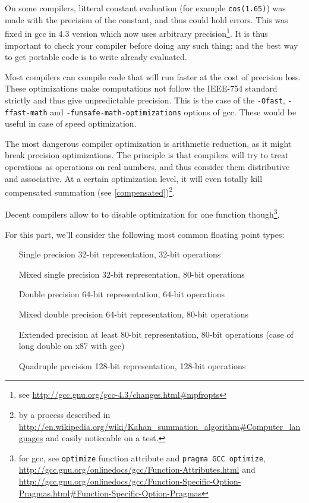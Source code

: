 
On some compilers, litteral constant evaluation (for example \texttt{cos(1.65)}) was made with the precision of the constant, and thus could hold errors. This was fixed in gcc in 4.3 version which now uses arbitrary precision\footnote{see \url{http://gcc.gnu.org/gcc-4.3/changes.html\#mpfropts}}. It is thus important to check your compiler before doing any such thing; and the best way to get portable code is to write already evaluated.


Most compilers can compile code that will run faster at the cost of precision loss. These optimizations make computations not follow the IEEE-754 standard strictly and thus give unpredictable precision. This is the case of the \texttt{-Ofast}, \texttt{-ffast-math} and \texttt{-funsafe-math-optimizations} options of gcc. These would be useful in case of speed optimization.

\label{arithmeticreduction}

The most dangerous compiler optimization is arithmetic reduction, as it might break precision optimizations. The principle is that compilers will try to treat operations as operations on real numbers, and thus consider them distributive and associative. At a certain optimization level, it will even totally kill compensated summation (see \ref{compensated})\footnote{by a process described in \url{http://en.wikipedia.org/wiki/Kahan_summation_algorithm\#Computer_languages} and easily noticeable on a test.}.

Decent compilers allow to to disable optimization for one function though\footnote{for gcc, see \texttt{optimize} function attribute and \texttt{pragma GCC optimize}, \url{http://gcc.gnu.org/onlinedocs/gcc/Function-Attributes.html} and \url{http://gcc.gnu.org/onlinedocs/gcc/Function-Specific-Option-Pragmas.html\#Function-Specific-Option-Pragmas}}.


For this part, we'll consider the following most common floating point types:

\begin{enumerate}
\item[Single precision] 32-bit representation, 32-bit operations
\item[Mixed single precision] 32-bit representation, 80-bit operations
\item[Double precision] 64-bit representation, 64-bit operations
\item[Mixed double precision] 64-bit representation, 80-bit operations
\item[Extended precision] at least 80-bit representation, 80-bit operations (case of long double on x87 with gcc)
\item[Quadruple precision] 128-bit representation, 128-bit operations
\end{enumerate}

